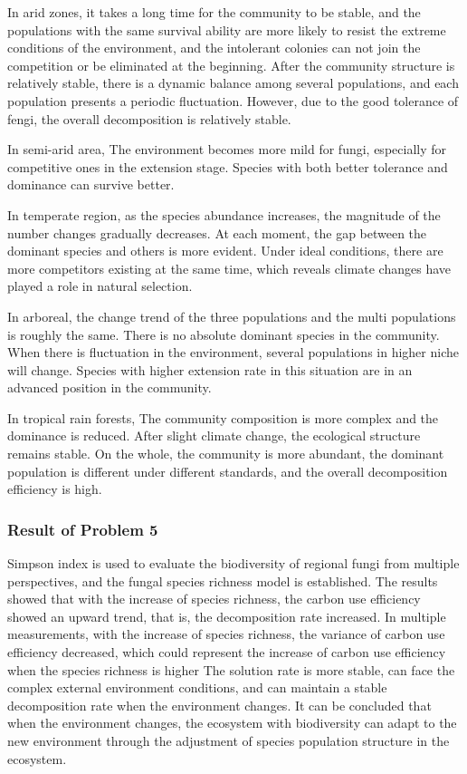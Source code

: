 \documentclass{mcmthesis}
\begin{document}
In arid zones, it takes a long time for the community to be stable, and the populations with the same survival ability are more likely to resist the extreme conditions of the environment, and the intolerant colonies can not join the competition or be eliminated at the beginning. After the community structure is relatively stable, there is a dynamic balance among several populations, and each population presents a periodic fluctuation. However, due to the good tolerance of fengi, the overall decomposition is relatively stable.

In semi-arid area, The environment becomes more mild for fungi, especially for competitive ones in the extension stage. Species with both better tolerance and dominance can survive better.

In temperate region, as the species abundance increases, the magnitude of the number changes gradually decreases. At each moment, the gap between the dominant species and others is more evident. Under ideal conditions, there are more competitors existing at the same time, which reveals climate changes have played a role in natural selection.

In arboreal,  the change trend of the three populations and the multi populations is roughly the same. There is no absolute dominant species in the community. When there is fluctuation in the environment, several populations in higher niche will change. Species with higher extension rate in this situation are in an advanced position in the community.

In tropical rain forests, The community composition is more complex and the dominance is reduced. After slight climate change, the ecological structure remains stable. On the whole, the community is more abundant, the dominant population is different under different standards, and the overall decomposition efficiency is high.

\subsubsection{Result of Problem 5}

Simpson index is used to evaluate the biodiversity of regional fungi from multiple perspectives, and the fungal species richness model is established. The results showed that with the increase of species richness, the carbon use efficiency showed an upward trend, that is, the decomposition rate increased. In multiple measurements, with the increase of species richness, the variance of carbon use efficiency decreased, which could represent the increase of carbon use efficiency when the species richness is higher The solution rate is more stable, can face the complex external environment conditions, and can maintain a stable decomposition rate when the environment changes. It can be concluded that when the environment changes, the ecosystem with biodiversity can adapt to the new environment through the adjustment of species population structure in the ecosystem.
\end{document}
